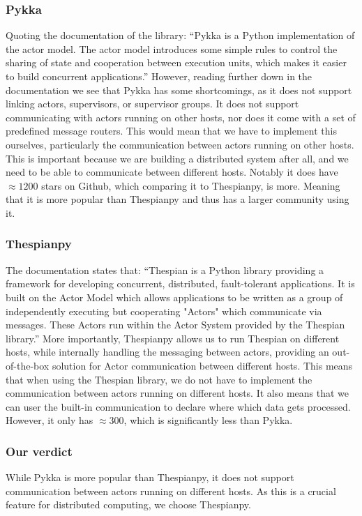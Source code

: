 \documentclass[a4paper]{article}
\begin{document}
\subsubsection{Pykka}
Quoting the documentation of the library: \enquote{Pykka is a Python implementation of the actor model. The actor model introduces some simple rules to control the sharing of state and cooperation between execution units, which makes it easier to build concurrent applications.} However, reading further down in the documentation we see that Pykka has some shortcomings, as it does not support linking actors, supervisors, or supervisor groups. It does not support communicating with actors running on other hosts, nor does it come with a set of predefined message routers. This would mean that we have to implement this ourselves, particularly the communication between actors running on other hosts. This is important because we are building a distributed system after all, and we need to be able to communicate between different hosts. Notably it does have \(\approx 1200\) stars on Github, which comparing it to Thespianpy, is more. Meaning that it is more popular than Thespianpy and thus has a larger community using it.
\subsubsection{Thespianpy}
The documentation states that: \enquote{Thespian is a Python library providing a framework for developing concurrent, distributed, fault-tolerant applications. It is built on the Actor Model which allows applications to be written as a group of independently executing but cooperating "Actors" which communicate via messages. These Actors run within the Actor System provided by the Thespian library.} More importantly, Thespianpy allows us to run Thespian on different hosts, while internally handling the messaging between actors, providing an out-of-the-box solution for Actor communication between different hosts. This means that when using the Thespian library, we do not have to implement the communication between actors running on different hosts. It also means that we can user the built-in communication to declare where which data gets processed. However, it only has \(\approx300\), which is significantly less than Pykka.
\subsubsection{Our verdict}
While Pykka is more popular than Thespianpy, it does not support communication between actors running on different hosts. As this is a crucial feature for distributed computing, we choose Thespianpy.
\end{document}
